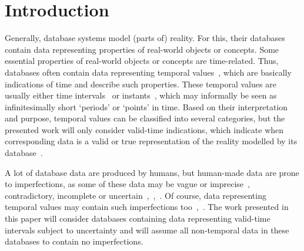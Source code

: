 \documentclass[runningheads,a4paper]{llncs}
\begin{document}
\section{Introduction}
Generally, database systems model (parts of) reality. For this, their databases contain data representing properties of real-world objects or concepts. Some essential properties of real-world objects or concepts are time-related. Thus, databases often contain data representing temporal values~\cite{Bohlen1998lncs}, which are basically indications of time and describe such properties. These temporal values are usually either time intervals~\cite{Bohlen1998lncs} or instants~\cite{Bohlen1998lncs}, which may informally be seen as infinitesimally short `periods' or `points' in time. Based on their interpretation and purpose, temporal values can be classified into several categories, but the presented work will only consider valid-time indications, which indicate when corresponding data is a valid or true representation of the reality modelled by its database~\cite{Bohlen1998lncs,Pons2012ijcis,Billiet2012ipmu,Pons2012ipmu}.

A lot of database data are produced by humans, but human-made data are prone to imperfections, as some of these data may be vague or imprecise~\cite{Medina1994is}, contradictory, incomplete or uncertain~\cite{Billiet2012ipmu},~\cite{Pons2012ipmu},~\cite{Bosc2010ijufkbs}. Of course, data representing temporal values may contain such imperfections too~\cite{Pons2012ijcis,Billiet2012ipmu,Pons2012ipmu},~\cite{Dyreson1998acm}. The work presented in this paper will consider databases containing data representing valid-time intervals subject to uncertainty and will assume all non-temporal data in these databases to contain no imperfections.
\end{document}
